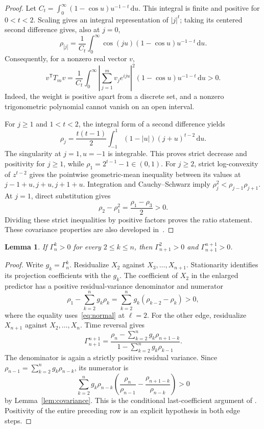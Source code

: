 \documentclass[11pt]{article}
\newtheorem{lemma}[theorem]{Lemma}
\newcommand{\dd}{\,\mathrm{d}}
\begin{document}
\begin{proof}
Let $C_t=\int_0^\infty(1-\cos u)u^{-1-t}\dd u$.
This integral is finite and positive for $0<t<2$. Scaling gives an
integral representation of $|j|^t$; taking its centered second difference
gives, also at $j=0$,
\[
 \rho_{|j|}=\frac1{C_t}\int_0^\infty
       \cos(ju)(1-\cos u)u^{-1-t}\dd u.
\]
Consequently, for a nonzero real vector $v$,
\[
 v^{\mathsf T}T_m v=\frac1{C_t}\int_0^\infty
   \left|\sum_{j=1}^m v_j e^{iju}\right|^2
   (1-\cos u)u^{-1-t}\dd u>0.
\]
Indeed, the weight is positive apart from a discrete set, and a nonzero
trigonometric polynomial cannot vanish on an open interval.

For $j\ge1$ and $1<t<2$, the integral form of a second difference yields
\begin{equation}\label{eq:second-difference}
 \rho_j=\frac{t(t-1)}2\int_{-1}^1
             (1-|u|)(j+u)^{t-2}\dd u.
\end{equation}
The singularity at $j=1,u=-1$ is integrable. This proves strict decrease
and positivity for $j\ge1$, while $\rho_1=2^{t-1}-1\in(0,1)$.
For $j\ge2$, strict log-convexity of $z^{t-2}$ gives the pointwise
geometric-mean inequality between its values at $j-1+u,j+u,j+1+u$.
Integration and Cauchy--Schwarz imply
$\rho_j^2<\rho_{j-1}\rho_{j+1}$. At $j=1$, direct substitution gives
\begin{equation}\label{eq:special-identity}
 \rho_2-\rho_1^2=\frac{\rho_1-\rho_3}{2}>0.
\end{equation}
Dividing these strict inequalities by positive factors proves the ratio
statement. These covariance properties are also developed
in~\cite{Mishura2022}.
\end{proof}

\begin{lemma}\label{lem:edges}
If $\Gamma_n^k>0$ for every $2\le k\le n$, then
$\Gamma_{n+1}^{2}>0$ and $\Gamma_{n+1}^{n+1}>0$.
\end{lemma}

\begin{proof}
Write $g_k=\Gamma_n^k$. Residualize $X_2$ against
$X_3,\ldots,X_{n+1}$. Stationarity identifies its projection coefficients
with the $g_k$. The coefficient of $X_2$ in the enlarged predictor has
a positive residual-variance denominator and numerator
\[
 \rho_1-\sum_{k=2}^n g_k\rho_k
   =\sum_{k=2}^n g_k(\rho_{k-2}-\rho_k)>0,
\]
where the equality uses~\eqref{eq:normal} at $\ell=2$.
For the other edge, residualize $X_{n+1}$ against $X_2,\ldots,X_n$.
Time reversal gives
\begin{equation}\label{eq:last}
 \Gamma_{n+1}^{n+1}=
 \frac{\rho_n-\sum_{k=2}^n g_k\rho_{n+1-k}}
      {1-\sum_{k=2}^n g_k\rho_{k-1}}.
\end{equation}
The denominator is again a strictly positive residual variance.
Since $\rho_{n-1}=\sum_{k=2}^n g_k\rho_{n-k}$, its numerator is
\[
 \sum_{k=2}^n g_k\rho_{n-k}
 \left(\frac{\rho_n}{\rho_{n-1}}
              -\frac{\rho_{n+1-k}}{\rho_{n-k}}\right)>0
\]
by Lemma~\ref{lem:covariance}. This is the conditional last-coefficient
argument of \cite[Proposition~2]{Bodnarchuk2025}. Positivity of the
entire preceding row is an explicit hypothesis in both edge steps.
\end{proof}
\end{document}
